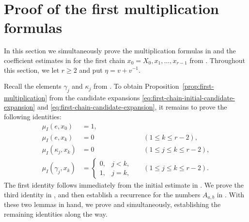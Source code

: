 \documentclass[11pt,a4paper,reqno]{amsart}
\numberwithin{equation}{section}
\theoremstyle{definition}
\theoremstyle{remark}
\theoremstyle{plain}
\newcommand{\mus}{\mu_I}
\begin{document}
\section{Proof of the first multiplication formulas}
\label{sec:first-multiplication-proof}

In this section we simultaneously prove the multiplication formulas in  and the coefficient estimates in  for the first chain $x_0=X_0,x_1,\ldots,x_{r-1}$ from .
Throughout this section, we let $r\geq2$ and put $\eta=v+v^{-1}$.

Recall the elements $\gamma_j$ and $\kappa_j$ from .
To obtain Proposition~\ref{prop:first-multiplication} from the candidate
expansions \eqref{eq:first-chain-initial-candidate-expansion}
and \eqref{eq:first-chain-candidate-expansion}, it remains to prove
the following identities:
\begin{equation}\label{eq:first-chain-required-multiplicities}
\begin{aligned}
 \mus(e,x_0)&=1,\\
 \mus(e,x_k)&=0
   &&(1\leq k\leq r-2),\\
 \mus(\kappa_j,x_k)&=0
   &&(1\leq j\leq k\leq r-2),\\
 \mus(\gamma_j,x_k)&=
 \begin{cases}
  0,&j<k,\\
  1,&j=k,
 \end{cases}
   &&(1\leq j\leq k\leq r-2).
\end{aligned}
\end{equation}
The first identity follows immediately from the initial estimate in .
We prove the third identity in , and then establish a recurrence
for the numbers $A_{a,b}$ in .
With these two lemmas in hand, we prove  and  simultaneously, establishing the remaining identities along the way.
\end{document}
